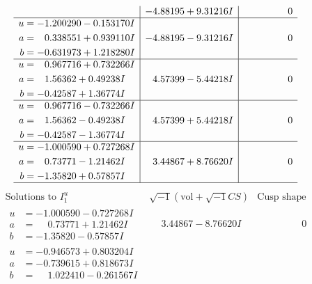 \documentclass[1p]{elsarticle_modified}
\theoremstyle{definition}
\newcommand{\I}{\sqrt{-1}}
\begin{document}
$$\begin{array}{c|c|c}
 & -4.88195 + 9.31216 I & \phantom{-0.000000 } 0 \\ \hline\begin{aligned}
u &= -1.200290 - 0.153170 I \\
a &= \phantom{-}0.338551 + 0.939110 I \\
b &= -0.631973 + 1.218280 I\end{aligned}
 & -4.88195 - 9.31216 I & \phantom{-0.000000 } 0 \\ \hline\begin{aligned}
u &= \phantom{-}0.967716 + 0.732266 I \\
a &= \phantom{-}1.56362 + 0.49238 I \\
b &= -0.42587 + 1.36774 I\end{aligned}
 & \phantom{-}4.57399 - 5.44218 I & \phantom{-0.000000 } 0 \\ \hline\begin{aligned}
u &= \phantom{-}0.967716 - 0.732266 I \\
a &= \phantom{-}1.56362 - 0.49238 I \\
b &= -0.42587 - 1.36774 I\end{aligned}
 & \phantom{-}4.57399 + 5.44218 I & \phantom{-0.000000 } 0 \\ \hline\begin{aligned}
u &= -1.000590 + 0.727268 I \\
a &= \phantom{-}0.73771 - 1.21462 I \\
b &= -1.35820 + 0.57857 I\end{aligned}
 & \phantom{-}3.44867 + 8.76620 I & \phantom{-0.000000 } 0\\
 \hline 
 \end{array}$$\newpage$$\begin{array}{c|c|c}  
\text{Solutions to }I^u_{1}& \I (\text{vol} + \sqrt{-1}CS) & \text{Cusp shape}\\
 \hline 
\begin{aligned}
u &= -1.000590 - 0.727268 I \\
a &= \phantom{-}0.73771 + 1.21462 I \\
b &= -1.35820 - 0.57857 I\end{aligned}
 & \phantom{-}3.44867 - 8.76620 I & \phantom{-0.000000 } 0 \\ \hline\begin{aligned}
u &= -0.946573 + 0.803204 I \\
a &= -0.739615 + 0.818673 I \\
b &= \phantom{-}1.022410 - 0.261567 I\end{aligned}

\end{array}$$
\end{document}
